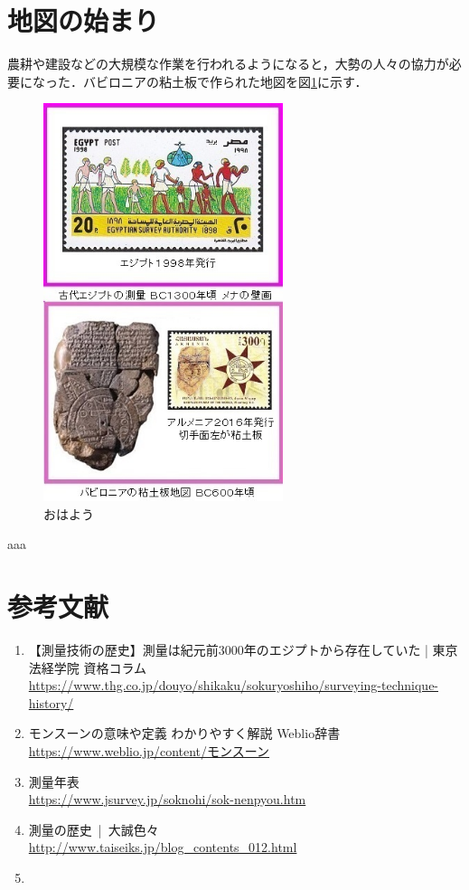 \documentclass[titlepage]{jarticle}
\begin{document}
\section{地図の始まり}
農耕や建設などの大規模な作業を行われるようになると，大勢の人々の協力が必要になった．バビロニアの粘土板で作られた地図を図\ref{map}に示す．
\begin{figure}[H]
  \centering
  \includegraphics[width=7cm]{img/バビロニア粘土板.jpg}
  \caption{おはよう}
  \label{map}
\end{figure}
aaa

\section*{参考文献}
\begin{enumerate}
  \item 【測量技術の歴史】測量は紀元前3000年のエジプトから存在していた | 東京法経学院 資格コラム\\
        \url{https://www.thg.co.jp/douyo/shikaku/sokuryoshiho/surveying-technique-history/}
  \item モンスーンの意味や定義 わかりやすく解説 Weblio辞書\\
        \url{https://www.weblio.jp/content/モンスーン}
  \item 測量年表\\
        \url{https://www.jsurvey.jp/soknohi/sok-nenpyou.htm}
  \item 測量の歴史 | 大誠色々\\
        \url{http://www.taiseiks.jp/blog_contents_012.html}
  \item
\end{enumerate}
% 
\end{document}
